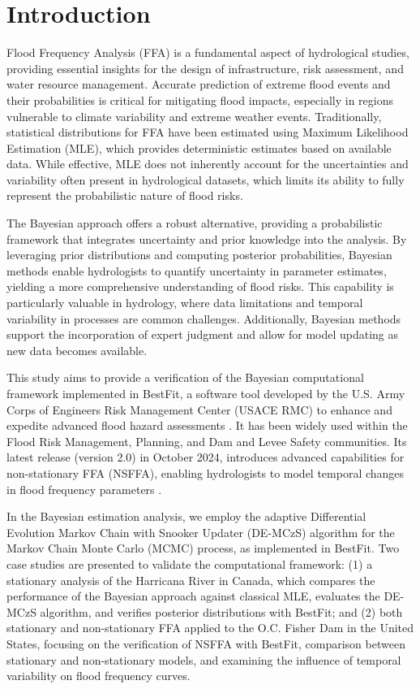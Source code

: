 \section{Introduction}
Flood Frequency Analysis (FFA) is a fundamental aspect of hydrological studies, providing essential insights for the design of infrastructure, risk assessment, and water resource management. Accurate prediction of extreme flood events and their probabilities is critical for mitigating flood impacts, especially in regions vulnerable to climate variability and extreme weather events. Traditionally, statistical distributions for FFA have been estimated using Maximum Likelihood Estimation (MLE), which provides deterministic estimates based on available data. While effective, MLE does not inherently account for the uncertainties and variability often present in hydrological datasets, which limits its ability to fully represent the probabilistic nature of flood risks.

The Bayesian approach offers a robust alternative, providing a probabilistic framework that integrates uncertainty and prior knowledge into the analysis. By leveraging prior distributions and computing posterior probabilities, Bayesian methods enable hydrologists to quantify uncertainty in parameter estimates, yielding a more comprehensive understanding of flood risks. This capability is particularly valuable in hydrology, where data limitations and temporal variability in processes are common challenges. Additionally, Bayesian methods support the incorporation of expert judgment and allow for model updating as new data becomes available.

This study aims to provide a verification of the Bayesian computational framework implemented in BestFit, a software tool developed by the U.S. Army Corps of Engineers Risk Management Center (USACE RMC) to enhance and expedite advanced flood hazard assessments \citep{Smith_2020}. It has been widely used within the Flood Risk Management, Planning, and Dam and Levee Safety communities. Its latest release (version 2.0) in October 2024, introduces advanced capabilities for non-stationary FFA (NSFFA), enabling hydrologists to model temporal changes in flood frequency parameters \citep{Smith_2024}.

In the Bayesian estimation analysis, we employ the adaptive Differential Evolution Markov Chain with Snooker Updater (DE-MCzS) algorithm for the Markov Chain Monte Carlo (MCMC) process, as implemented in BestFit. Two case studies are presented to validate the computational framework: (1) a stationary analysis of the Harricana River in Canada, which compares the performance of the Bayesian approach against classical MLE, evaluates the DE-MCzS algorithm, and verifies posterior distributions with BestFit; and (2) both stationary and non-stationary FFA applied to the O.C. Fisher Dam in the United States, focusing on the verification of NSFFA with BestFit, comparison between stationary and non-stationary models, and examining the influence of temporal variability on flood frequency curves.

\FloatBarrier
